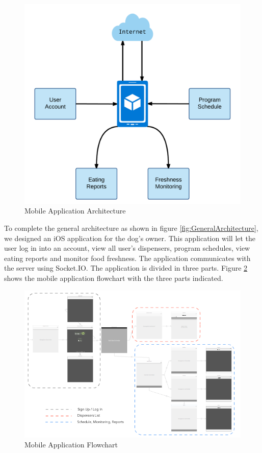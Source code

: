\documentclass[12pt]{article}
\begin{document}
\begin{figure}[!htb]
  \begin{center}
    \includegraphics[scale=0.2]{Figures/ArchitectureApplication}
  \end{center}
  \caption{Mobile Application Architecture}
  \label{fig:AppArchitecture}
\end{figure}

To complete the general architecture as shown in figure \ref{fig:GeneralArchitecture}, we designed an iOS application for the dog's owner. This application will let the user log in into an account, view all user's dispensers, program schedules, view eating reports and monitor food freshness. The application communicates with the server using Socket.IO. The application is divided in three parts. Figure \ref{fig:AppFlowchart} shows the mobile application flowchart with the three parts indicated.

\begin{figure}[!htb]
  \includegraphics[scale=0.6]{Figures/MobileAppScenes}
  \caption{Mobile Application Flowchart}
  \label{fig:AppFlowchart}
\end{figure}
\end{document}
